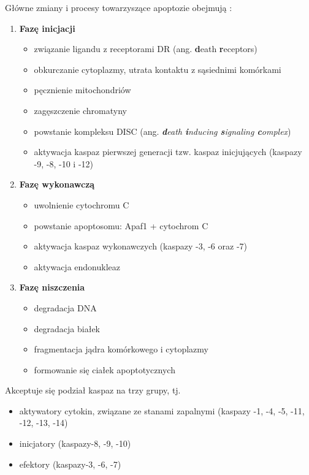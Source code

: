 Główne zmiany i procesy towarzyszące apoptozie obejmują \cite{Hengartner2000,Shi2001}:

\begin{enumerate}
\item \textbf{Fazę inicjacji}
 \begin{itemize}
  \item związanie ligandu z receptorami DR (ang. \textbf{d}eath \textbf{r}eceptors)
  \item obkurczanie cytoplazmy, utrata kontaktu z sąsiednimi komórkami
  \item pęcznienie mitochondriów
  \item zagęszczenie chromatyny
  \item powstanie kompleksu DISC (ang. \textit{\textbf{d}eath \textbf{i}nducing \textbf{s}ignaling \textbf{c}omplex})
  \item aktywacja kaspaz pierwszej generacji tzw. kaspaz inicjujących (kaspazy -9, -8, -10 i -12)
 \end{itemize}
\item \textbf{Fazę wykonawczą}
 \begin{itemize}
  \item uwolnienie cytochromu C
  \item powstanie apoptosomu: Apaf1 + cytochrom C
  \item aktywacja kaspaz wykonawczych (kaspazy -3, -6 oraz -7)
  \item aktywacja endonukleaz
 \end{itemize}
\item \textbf{Fazę niszczenia}
 \begin{itemize}
  \item degradacja DNA
  \item degradacja białek
  \item fragmentacja jądra komórkowego i cytoplazmy
  \item formowanie się ciałek apoptotycznych
 \end{itemize}
\end{enumerate}

Akceptuje się podział kaspaz na trzy grupy, tj.

\begin{itemize}
\item aktywatory cytokin, związane ze stanami zapalnymi (kaspazy -1, -4, -5, -11, -12, -13, -14)
\item inicjatory (kaspazy-8, -9, -10)
\item efektory (kaspazy-3, -6, -7)
\end{itemize}

